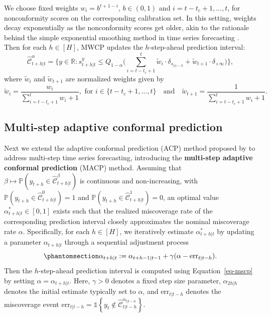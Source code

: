 \documentclass[
  11pt,
  a4paper,
]{article}
\theoremstyle{plain}
\theoremstyle{remark}
\begin{document}
We choose fixed weights \(w_i = b^{t+1-i}\), \(b \in (0, 1)\) and
\(i=t-t_c+1,\ldots,t\), for nonconformity scores on the corresponding
calibration set. In this setting, weights decay exponentially as the
nonconformity scores get older, akin to the rationale behind the simple
exponential smoothing method in time series forecasting
\autocite{hyndman2021}. Then for each \(h \in [H]\), MWCP updates the
\(h\)-step-ahead prediction interval: \[
\hat{\mathcal{C}}_{t+h|t}^{\alpha} = \Bigg\{y\in\mathbb{R}: s_{t+h|t}^{y} \leq Q_{1-\alpha}\Bigg(\sum_{i=t-t_c+1}^{t}\tilde{w}_i\cdot\delta_{s_{i|i-h}}+\tilde{w}_{t+1}\cdot\delta_{+\infty}\Bigg)\Bigg\},
\] where \(\tilde{w}_i\) and \(\tilde{w}_{t+1}\) are normalized weights
given by \[
\tilde{w}_i = \frac{w_i}{\sum_{i=t-t_c+1}^{t}w_i+1}, \text{ for } i \in \{t-t_c+1,\ldots,t\} \quad \text{and} \quad \tilde{w}_{t+1} =  \frac{1}{\sum_{i=t-t_c+1}^{t}w_i+1}.
\]

\subsection{Multi-step adaptive conformal
prediction}\label{multi-step-adaptive-conformal-prediction}

Next we extend the adaptive conformal prediction (ACP) method proposed
by \textcite{gibbs2021} to address multi-step time series forecasting,
introducing the \textbf{multi-step adaptive conformal prediction} (MACP)
method. Assuming that
\(\beta \mapsto \mathbb{P}(y_{t+h} \in \hat{\mathcal{C}}_{t+h|t}^{\beta})\)
is continuous and non-increasing, with
\(\mathbb{P}(y_{t+h} \in \hat{\mathcal{C}}_{t+h|t}^{0}) = 1\) and
\(\mathbb{P}(y_{t+h} \in \hat{\mathcal{C}}_{t+h|t}^{1}) = 0\), an
optimal value \(\alpha_{t+h|t}^{*} \in [0,1]\) exists such that the
realized miscoverage rate of the corresponding prediction interval
closely approximates the nominal miscoverage rate \(\alpha\).
Specifically, for each \(h \in [H]\), we iteratively estimate
\(\alpha_{t+h|t}^{*}\) by updating a parameter \(\alpha_{t+h|t}\)
through a sequential adjustment process
\begin{equation}\phantomsection\label{eq-macp}{
\alpha_{t+h|t} := \alpha_{t+h-1|t-1} + \gamma(\alpha - \mathrm{err}_{t|t-h}).
}\end{equation} Then the \(h\)-step-ahead prediction interval is
computed using Equation~\ref{eq-mscp} by setting
\(\alpha = \alpha_{t+h|t}\). Here, \(\gamma > 0\) denotes a fixed step
size parameter, \(\alpha_{2h|h}\) denotes the initial estimate typically
set to \(\alpha\), and \(\mathrm{err}_{t|t-h}\) denotes the miscoverage
event
\(\mathrm{err}_{t|t-h} = \mathbb{1}\left\{y_t \notin \hat{\mathcal{C}}_{t|t-h}^{\alpha_{t|t-h}}\right\}\).
\end{document}
